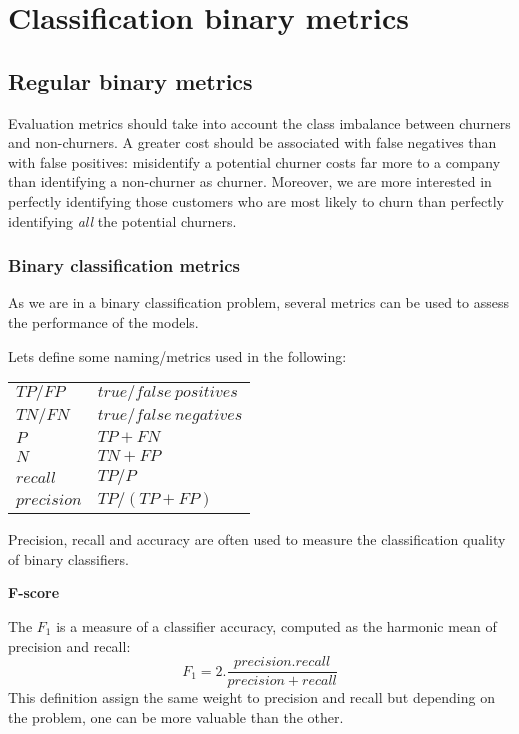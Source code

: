 \chapter{Classification binary metrics}



\section{Regular binary metrics}


Evaluation metrics should take into account the class imbalance between churners and non-churners. A greater cost should be associated with false negatives than with false positives: misidentify a potential churner costs far more to a company than identifying a non-churner as churner. Moreover, we are more interested in perfectly identifying those customers who are most likely to churn than perfectly identifying \textit{all} the potential churners.

\subsection{Binary classification metrics}

As we are in a binary classification problem, several metrics can be used to assess the performance of the models.

Lets define some naming/metrics used in the following:

{\ttfamily
\begin{table}[H]
    \centering
    \begin{tabular}{ll}
        \toprule
        $TP / FP$          &    $true/false\ positives$ \\
        $TN / FN$       &    $true/false\ negatives$  \\
        $P$       &    $TP+FN$ \\
        $N$    &    $TN + FP$ \\
        $recall$      &    ${TP} / {P}$ \\
        $precision$        &   ${TP} / {(TP+FP)}$ \\
        \bottomrule
    \end{tabular}
\end{table}
}

Precision, recall and accuracy are often used to measure the classification quality of binary classifiers.


\textbf{F-score}

The $F_1$ is a measure of a classifier accuracy, computed as the harmonic mean of precision and recall: $$F_1= 2. \frac{precision.recall}{precision+recall}$$\tabularnewline
This definition assign the same weight to precision and recall but depending on the problem, one can be more valuable than the other.

